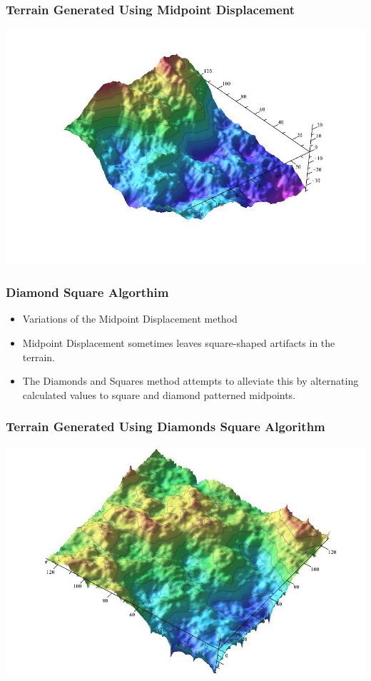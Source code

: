 \documentclass{beamer}
\begin{document}
\begin{frame}
\frametitle{Terrain Generated Using Midpoint Displacement}
\begin{center}
\includegraphics[scale=0.37]{midpoints.jpg}
\end{center}
\end{frame}

\begin{frame}
 \frametitle{Diamond Square Algorthim}
\begin{itemize}
\item Variations of the Midpoint Displacement method
\item Midpoint Displacement sometimes leaves square-shaped artifacts in the terrain. 
\item The Diamonds and Squares method attempts to alleviate this by alternating calculated values to square and diamond patterned midpoints. 
\end{itemize}
\end{frame}

\begin{frame}
\frametitle{Terrain Generated Using Diamonds Square Algorithm}
\begin{center}
\includegraphics[scale=0.33]{diamondsandsquares.jpg}
\end{center}
\end{frame}
\end{document}
